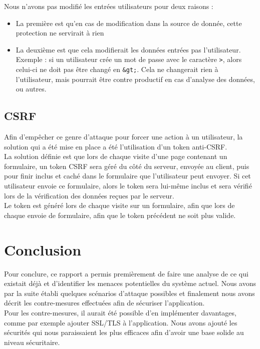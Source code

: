 \documentclass[a4paper,10pt]{article}
\begin{document}
Nous n'avons pas modifié les entrées utilisateurs pour deux raisons : 
 \begin{onehalfspacing}
        \begin{itemize}
        \item La première est qu'en cas de modification dans la source de donnée, cette protection ne servirait à rien
        \item La deuxième est que cela modifierait les données entrées pas l'utilisateur. Exemple : si un utilisateur crée un mot de passe avec le caractère \verb|>|, alors celui-ci ne doit pas être changé en \verb|&gt;|. Cela ne changerait rien à l'utilisateur, mais pourrait être contre productif en cas d'analyse des données, ou autres. \\
        \end{itemize}
        \end{onehalfspacing}
    \subsection*{CSRF}
    Afin d'empêcher ce genre d'attaque pour forcer une action à un utilisateur, la solution qui a été mise en place a été l'utilisation d'un token anti-CSRF. \\

La solution définie est que lors de chaque visite d'une page contenant un formulaire, un token CSRF sera géré du côté du serveur, envoyée au client, puis pour finir inclus et caché dans le formulaire que l'utilisateur peut envoyer. Si cet utilisateur envoie ce formulaire, alors le token sera lui-même inclus et sera vérifié lors de la vérification des données reçues par le serveur. \\

Le token est généré lors de chaque visite sur un formulaire, afin que lors de chaque envoie de formulaire, afin que le token précédent ne soit plus valide.
\section*{Conclusion}
Pour conclure, ce rapport a permis premièrement de faire une analyse de ce qui existait déjà et d'identifier les menaces potentielles du système actuel. Nous avons par la suite établi quelques scénarios d'attaque possibles et finalement nous avons décrit les contre-mesures effectuées afin de sécuriser l'application. \\

Pour les contre-mesures, il aurait été possible d'en implémenter davantages, comme par exemple ajouter SSL/TLS à l'application. Nous avons ajouté les sécurités qui nous paraissaient les plus efficaces afin d'avoir une base solide au niveau sécuritaire.
\end{document}
